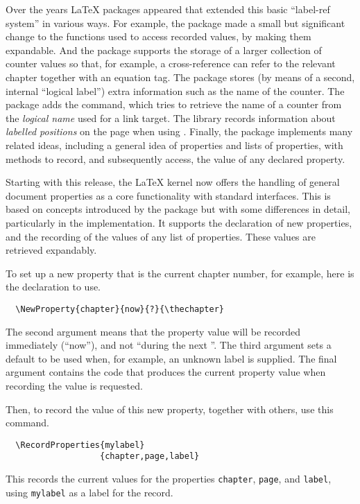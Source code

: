 \documentclass{ltnews}
\begin{document}
Over the years \LaTeX{} packages appeared that extended
this basic \enquote{label-ref system} in various ways.
%
For example, the  package made a small but significant change
to the functions used to access recorded values, by making them expandable.
And the  package supports the storage of a larger
collection of counter values so that, for example, a cross-reference
can refer to the relevant chapter together with an equation tag.
The  package stores (by means of a second, internal
\enquote{logical label}) extra information such as the name of the counter.
The  package adds the  command, which
tries to retrieve the name of a counter from the  \emph{logical name}
used for a link target.
The  library records information about
 \emph{labelled positions} on the page when using .
Finally, the  package implements many related ideas, including a general
idea of properties and lists of properties, with methods to record, and
subsequently access, the value of any declared property.


Starting with this release, the \LaTeX{} kernel now offers the handling of general document
properties as a core functionality with standard interfaces.
%
This is based on concepts introduced by the 
package but with some differences in detail, particularly
in the implementation.
It supports the declaration of new properties, and the recording of
the values of any list of properties. These values are retrieved expandably.

To set up a new property that is the current chapter
number, for example, here is the declaration to use.
\begin{verbatim}
  \NewProperty{chapter}{now}{?}{\thechapter}
\end{verbatim}
The second argument means that the property value will be recorded
immediately (\enquote{now}), and not \enquote{during the next }.
The third argument sets a default
to be used when, for example, an unknown label is supplied.
The final argument contains the code that produces the current
property value when recording the value is requested.

Then, to record the value of this new property,
together with others, use this command.
\begin{verbatim}
  \RecordProperties{mylabel}
                   {chapter,page,label}
\end{verbatim}
This records the current values for the properties \texttt{chapter},
\texttt{page}, and \texttt{label}, using \texttt{mylabel} as a label
for the record.
\end{document}
